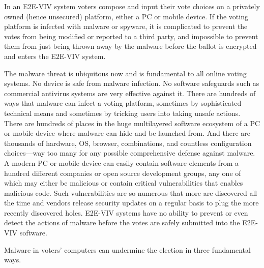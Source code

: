 In an E2E-VIV system voters compose and input their vote choices on a
privately owned (hence unsecured) platform, either a PC or mobile
device. If the voting platform is infected with malware or spyware, it
is complicated to prevent the votes from being modified or reported to
a third party, and impossible to prevent them from just being thrown
away by the malware before the ballot is encrypted and enters the
E2E-VIV system.

The malware threat is ubiquitous now and is fundamental to all online
voting systems. No device is safe from malware infection. No software
safeguards such as commercial antivirus systems are very effective
against it. There are hundreds of ways that malware can infect a
voting platform, sometimes by sophisticated technical means and
sometimes by tricking users into taking unsafe actions. There are
hundreds of places in the huge multilayered software ecosystem of a PC
or mobile device where malware can hide and be launched from. And
there are thousands of hardware, OS, browser, combinations, and
countless configuration choices---way too many for any possible
comprehensive defense against malware. A modern PC or mobile device
can easily contain software elements from a hundred different
companies or open source development groups, any one of which may
either be malicious or contain critical vulnerabilities that enables
malicious code. Such vulnerabilities are so numerous that more are
discovered all the time and vendors release security updates on a
regular basis to plug the more recently discovered holes. E2E-VIV
systems have no ability to prevent or even detect the actions of
malware before the votes are safely submitted into the E2E-VIV
software.

Malware in voters' computers can undermine the election in three
fundamental ways. 

